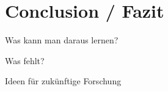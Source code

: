 \chapter{Conclusion / Fazit}
\label{ch:conclusion}

Was kann man daraus lernen?

Was fehlt?

Ideen für zukünftige Forschung